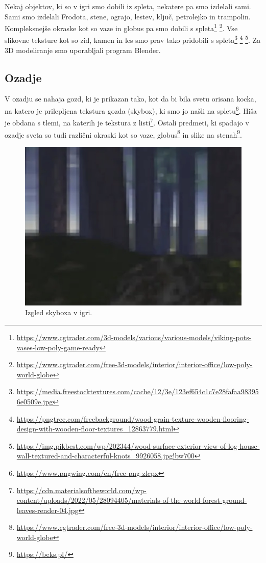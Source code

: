 \documentclass[a4paper,12pt]{article}
\begin{document}
Nekaj objektov, ki so v igri smo dobili iz spleta, nekatere pa smo izdelali sami. Sami smo izdelali Frodota, stene, ograjo, lestev, ključ, petrolejko in trampolin. Kompleksnejše okraske kot so vaze in globus pa smo dobili s spleta\footnote{\url{https://www.cgtrader.com/3d-models/various/various-models/viking-pots-vases-low-poly-game-ready}} \footnote{\url{https://www.cgtrader.com/free-3d-models/interior/interior-office/low-poly-world-globe}}. Vse slikovne teksture kot so zid, kamen in les smo prav tako pridobili s spleta\footnote{\url{https://media.freestocktextures.com/cache/12/3e/123ef654c1c7e28fafaa983956e0509e.jpg}} \footnote{\url{https://pngtree.com/freebackground/wood-grain-texture-wooden-flooring-design-with-wooden-floor-textures_12863779.html}} \footnote{\url{https://img.pikbest.com/wp/202344/wood-surface-exterior-view-of-log-house-wall-textured-and-characterful-knots_9926058.jpg!bw700}}. Za 3D modeliranje smo uporabljali program Blender.


\subsection{Ozadje}
V ozadju se nahaja gozd, ki je prikazan tako, kot da bi bila svetu orisana kocka, na katero je prilepljena tekstura gozda (skybox), ki smo jo našli na spletu\footnote{\url{https://www.pngwing.com/en/free-png-zlcpx}}. Hiša je obdana s tlemi, na katerih je tekstura z listi\footnote{\url{https://cdn.materialsoftheworld.com/wp-content/uploads/2022/05/28094405/materials-of-the-world-forest-ground-leaves-render-04.jpg}}. Ostali predmeti, ki spadajo v ozadje sveta so tudi različni okraski kot so vaze, globus\footnote{\url{https://www.cgtrader.com/free-3d-models/interior/interior-office/low-poly-world-globe}} in slike na stenah\footnote{\url{https://beks.pl/}}.

\begin{figure}[!htb]
    \begin{center}
        \includegraphics[width=0.8\columnwidth]{skybox.jpg}
        \caption{Izgled skyboxa v igri.}
    \end{center}
\end{figure}
\end{document}
